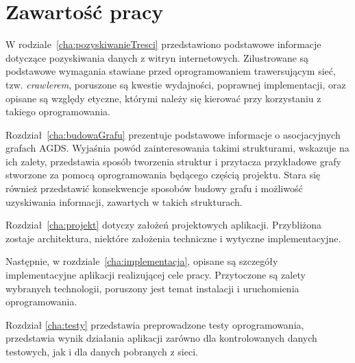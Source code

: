 
\section{Zawartość pracy}
\label{sec:zawartoscPracy}

W rodziale~\ref{cha:pozyskiwanieTresci} przedstawiono podstawowe informacje dotyczące pozyskiwania danych z witryn internetowych. Zilustrowane są podstawowe wymagania stawiane przed oprogramowaniem trawersującym sieć, tzw. \emph{crawlerem}, poruszone są kwestie wydajności, poprawnej implementacji, oraz opisane są względy etyczne, którymi należy się kierować przy korzystaniu z takiego oprogramowania.

Rozdział~\ref{cha:budowaGrafu} prezentuje podstawowe informacje o asocjacyjnych grafach AGDS. Wyjaśnia powód zainteresowania takimi strukturami, wskazuje na ich zalety, przedstawia sposób tworzenia struktur i przytacza przykładowe grafy stworzone za pomocą oprogramowania będącego częścią projektu. Stara się również przedstawić konsekwencje sposobów budowy grafu i możliwość uzyskiwania informacji, zawartych w takich strukturach.

Rozdział~\ref{cha:projekt} dotyczy założeń projektowych aplikacji. Przybliżona zostaje architektura, niektóre założenia techniczne i wytyczne implementacyjne.

Następnie, w rozdziale~\ref{cha:implementacja}, opisane są szczegóły implementacyjne aplikacji realizującej cele pracy. Przytoczone są zalety wybranych technologii, poruszony jest temat instalacji i uruchomienia oprogramowania.

Rozdział \ref{cha:testy} przedstawia preprowadzone testy oprogramowania, przedstawia wynik działania aplikacji zarówno dla kontrolowanych danych testowych,
jak i dla danych pobranych z sieci.


















